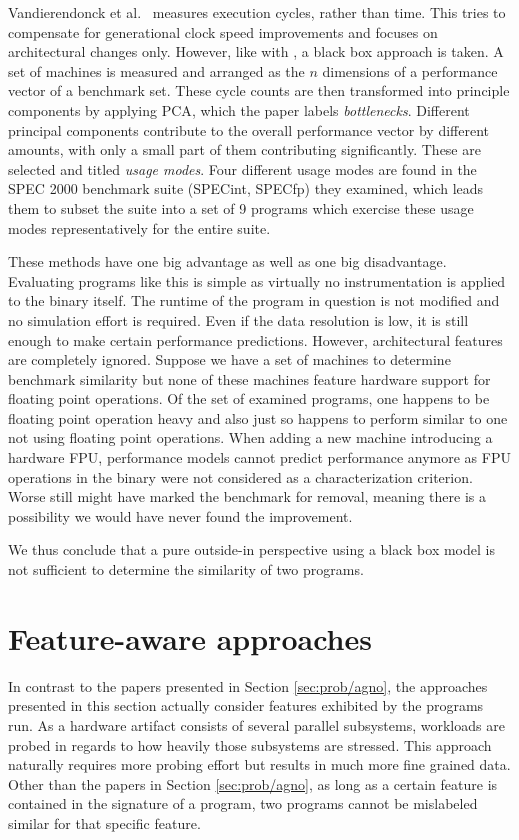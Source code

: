 \documentclass[../bachelor_paper.tex]{subfiles}
\begin{document}
Vandierendonck et al.\ \cite{vandierendonckManyBenchmarksStress} measures execution cycles, rather than time. This tries to compensate for generational clock speed improvements and focuses on architectural changes only. However, like with \cite{dujmovicEvolutionEvaluationSPEC1998}, a black box approach is taken. A set of machines is measured and arranged as the $n$ dimensions of a performance vector of a benchmark set. These cycle counts are then transformed into principle components by applying \ac{PCA}, which the paper labels \emph{bottlenecks}. Different principal components contribute to the overall performance vector by different amounts, with only a small part of them contributing significantly. These are selected and titled \emph{usage modes}. Four different usage modes are found in the \ac{SPEC} 2000 benchmark suite (\acs{SPEC}int, \acs{SPEC}fp) they examined, which leads them to subset the suite into a set of 9 programs which exercise these usage modes representatively for the entire suite.

These methods have one big advantage as well as one big disadvantage. Evaluating programs like this is simple as virtually no instrumentation is applied to the binary itself. The runtime of the program in question is not modified and no simulation effort is required. Even if the data resolution is low, it is still enough to make certain performance predictions. However, architectural features are completely ignored. Suppose we have a set of machines to determine benchmark similarity but none of these machines feature hardware support for floating point operations. Of the set of examined programs, one happens to be floating point operation heavy and also just so happens to perform similar to one not using floating point operations. When adding a new machine introducing a hardware \ac{FPU}, performance models cannot predict performance anymore as \ac{FPU} operations in the binary were not considered as a characterization criterion. Worse still \cite{vandierendonckManyBenchmarksStress} might have marked the benchmark for removal, meaning there is a possibility we would have never found the improvement.

We thus conclude that a pure outside-in perspective using a black box model is not sufficient to determine the similarity of two programs.

\section{Feature-aware approaches}
	\label{sec:prob/aware}
In contrast to the papers presented in Section \ref{sec:prob/agno}, the approaches presented in this section actually consider features exhibited by the programs run. As a hardware artifact consists of several parallel subsystems, workloads are probed in regards to how heavily those subsystems are stressed. This approach naturally requires more probing effort but results in much more fine grained data. Other than the papers in Section \ref{sec:prob/agno}, as long as a certain feature is contained in the signature of a program, two programs cannot be mislabeled similar for that specific feature.
\end{document}
